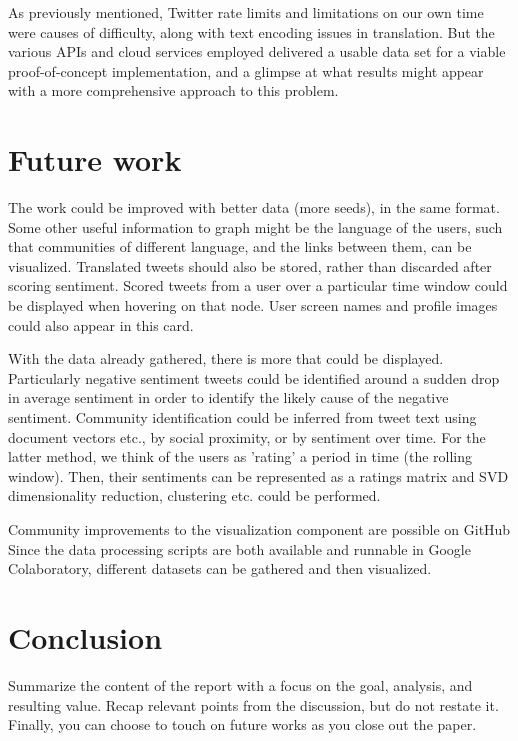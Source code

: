 \documentclass[11pt]{article}
\begin{document}
As previously mentioned, Twitter rate limits and limitations on our own time were causes of difficulty, along with text encoding issues in translation. But the various APIs and cloud services employed delivered a usable data set for a viable proof-of-concept implementation, and a glimpse at what results might appear with a more comprehensive approach to this problem.


\section{Future work}
The work could be improved with better data (more seeds), in the same format. Some other useful information to graph might be the language of the users, such that communities of different language, and the links between them, can be visualized. Translated tweets should also be stored, rather than discarded after scoring sentiment. Scored tweets from a user over a particular time window could be displayed when hovering on that node. User screen names and profile images could also appear in this card.\newline

With the data already gathered, there is more that could be displayed. Particularly negative sentiment tweets could be identified around a sudden drop in average sentiment in order to identify the likely cause of the negative sentiment. Community identification could be inferred from tweet text using document vectors etc., by social proximity, or by sentiment over time. For the latter method, we think of the users as 'rating' a period in time (the rolling window). Then, their sentiments can be represented as a ratings matrix and SVD dimensionality reduction, clustering etc. could be performed.\newline

Community improvements to the visualization component are possible on GitHub Since the data processing scripts are both available and runnable in Google Colaboratory, different datasets can be gathered and then visualized.


\section{Conclusion}
Summarize the content of the report with a focus on the goal, analysis, and resulting value. Recap relevant points from the discussion, but do not restate it. Finally, you can choose to touch on future works as you close out the paper.\newline
\end{document}
